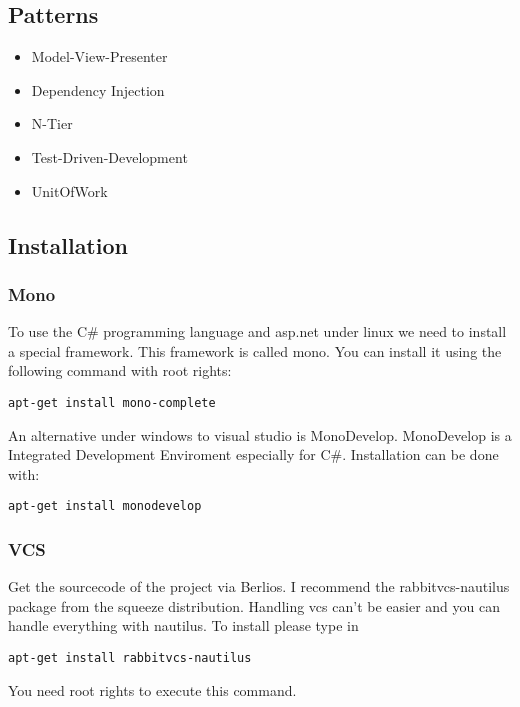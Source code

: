 \documentclass{article}
\begin{document}
\subsection{Patterns}
\begin{itemize}
  \item Model-View-Presenter
  \item Dependency Injection
  \item N-Tier
  \item Test-Driven-Development
  \item UnitOfWork
\end{itemize}

\subsection{Installation}

\subsubsection{Mono}
To use the C\# programming language and asp.net under linux we need to install
a special framework. This framework is called mono.
You can install it using the following command with root rights:
\begin{verbatim}
apt-get install mono-complete
\end{verbatim}
An alternative under windows to visual studio is MonoDevelop. MonoDevelop is a
Integrated Development Enviroment especially for C\#.
Installation can be done with:
\begin{verbatim}
apt-get install monodevelop
\end{verbatim}

\subsubsection{VCS}
Get the sourcecode of the project via Berlios.
I recommend the rabbitvcs-nautilus package from the squeeze distribution.
Handling vcs can't be easier and you can handle everything with nautilus.
To install please type in
\begin{verbatim}
apt-get install rabbitvcs-nautilus
\end{verbatim}
You need root rights to execute this command.
\end{document}
